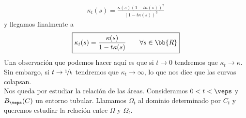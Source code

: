 \begin{ejercicio}
\begin{solucion}
        \begin{gather*}
            \kappa_t(s) = \frac{\kappa(s)(1-t\kappa(s))^2}{(1-t\kappa(s))^3}
        \end{gather*}
        y llegamos finalmente a 
        \begin{gather*}
            \boxed{\kappa_t(s) = \frac{\kappa(s)}{1-t\kappa(s)} \qquad \forall s \in \bb{R}}
        \end{gather*}
        Una observación que podemos hacer aquí es que si $t\to 0$ tendremos que $\kappa_t \to \kappa$. Sin embargo, si $t\to \nicefrac{1}{k}$ tendremos que $\kappa_t\to \infty$, lo que nos dice que las curvas colapsan.\\

        Nos queda por estudiar la relación de las áreas. Consideramos $0<t<\veps$ y $B_\veps(C)$ un entorno tubular. Llamamos $\Omega_t$ al dominio determinado por $C_t$ y queremos estudiar la relación entre $\Omega$ y $\Omega_t$.\\


\end{solucion}
\end{ejercicio}
